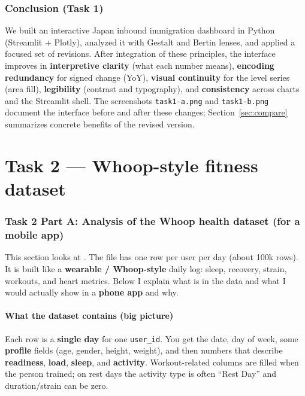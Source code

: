 \documentclass[11pt,a4paper]{article}
\begin{document}
\section{Conclusion (Task 1)}

We built an interactive Japan inbound immigration dashboard in Python (Streamlit + Plotly), analyzed it with Gestalt and Bertin lenses, and applied a focused set of revisions. After integration of these principles, the interface improves in \textbf{interpretive clarity} (what each number means), \textbf{encoding redundancy} for signed change (YoY), \textbf{visual continuity} for the level series (area fill), \textbf{legibility} (contrast and typography), and \textbf{consistency} across charts and the Streamlit shell. The screenshots \texttt{task1-a.png} and \texttt{task1-b.png} document the interface before and after these changes; Section~\ref{sec:compare} summarizes concrete benefits of the revised version.

\part{Task 2 --- Whoop-style fitness dataset}

\section{Task 2 Part A: Analysis of the Whoop health dataset (for a mobile app)}
\label{sec:whoop}

This section looks at . The file has one row per user per day (about 100k rows). It is built like a \textbf{wearable / Whoop-style} daily log: sleep, recovery, strain, workouts, and heart metrics. Below I explain what is in the data and what I would actually show in a \textbf{phone app} and why.

\subsection{What the dataset contains (big picture)}
Each row is a \textbf{single day} for one \texttt{user\_id}. You get the date, day of week, some \textbf{profile} fields (age, gender, height, weight), and then numbers that describe \textbf{readiness}, \textbf{load}, \textbf{sleep}, and \textbf{activity}. Workout-related columns are filled when the person trained; on rest days the activity type is often ``Rest Day'' and duration/strain can be zero.
\end{document}
